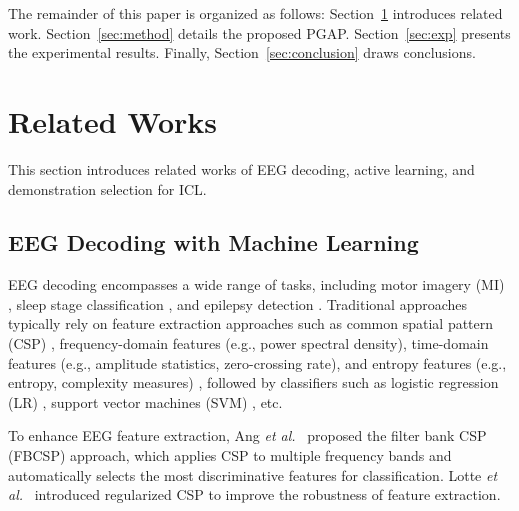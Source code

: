 \documentclass[journal,twocolumn]{IEEEtran}
\begin{document}
The remainder of this paper is organized as follows: Section~\ref{sec:related} introduces related work. Section~\ref{sec:method} details the proposed PGAP. Section~\ref{sec:exp} presents the experimental results. Finally, Section~\ref{sec:conclusion} draws conclusions.


\section{Related Works}
\label{sec:related}

This section introduces related works of EEG decoding, active learning, and demonstration selection for ICL.
 
\subsection{EEG Decoding with Machine Learning}
EEG decoding encompasses a wide range of tasks, including motor imagery (MI) \cite{decety1996neurophysiological, liu2025spatial}, sleep stage classification \cite{aboalayon2016sleep}, and epilepsy detection \cite{wang2023tasa}. Traditional approaches typically rely on feature extraction approaches such as common spatial pattern (CSP) \cite{Ramoser2000}, frequency-domain features (e.g., power spectral density), time-domain features (e.g., amplitude statistics, zero-crossing rate), and entropy features (e.g., entropy, complexity measures) \cite{hassan2017automated}, followed by classifiers such as logistic regression (LR) \cite{cox1958regression}, support vector machines (SVM) \cite{cortes1995support}, etc.

To enhance EEG feature extraction, Ang \textit{et al.}~\cite{4634130} proposed the filter bank CSP (FBCSP) approach, which applies CSP to multiple frequency bands and automatically selects the most discriminative features for classification. Lotte \textit{et al.}~\cite{Lotte2011} introduced regularized CSP to improve the robustness of feature extraction.
\end{document}
